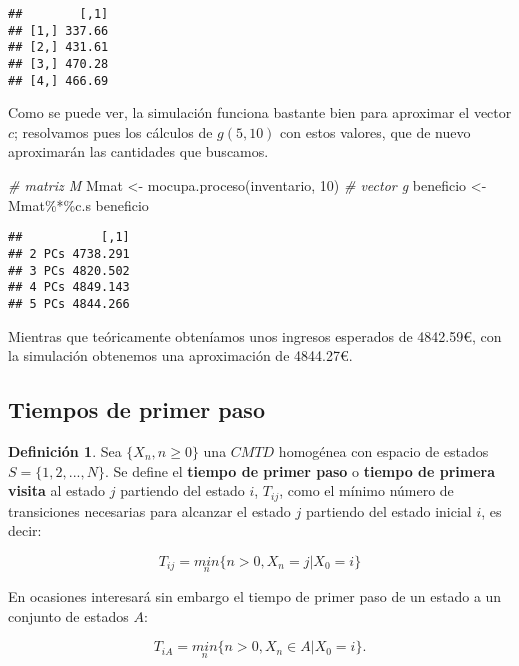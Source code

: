 \documentclass[
]{book}
\newenvironment{Shaded}{\begin{snugshade}}{\end{snugshade}}
\newcommand{\CommentTok}[1]{\textcolor[rgb]{0.56,0.35,0.01}{\textit{#1}}}
\newcommand{\DecValTok}[1]{\textcolor[rgb]{0.00,0.00,0.81}{#1}}
\newcommand{\FunctionTok}[1]{\textcolor[rgb]{0.00,0.00,0.00}{#1}}
\newcommand{\NormalTok}[1]{#1}
\newcommand{\OtherTok}[1]{\textcolor[rgb]{0.56,0.35,0.01}{#1}}
\newcommand{\SpecialCharTok}[1]{\textcolor[rgb]{0.00,0.00,0.00}{#1}}
\newenvironment{yellowbox}{
  \definecolor{shadecolor}{rgb}{210, 180, 140}  
  \color{black}
  \begin{shaded}}
 {\end{shaded}}
\theoremstyle{definition}
\newtheorem{definition}{Definición}[chapter]
\theoremstyle{definition}
\theoremstyle{definition}
\theoremstyle{definition}
\theoremstyle{remark}
\begin{document}
\begin{verbatim}
##        [,1]
## [1,] 337.66
## [2,] 431.61
## [3,] 470.28
## [4,] 466.69
\end{verbatim}

Como se puede ver, la simulación funciona bastante bien para aproximar el vector \(c\); resolvamos pues los cálculos de \(g(5,10)\) con estos valores, que de nuevo aproximarán las cantidades que buscamos.

\begin{Shaded}
\begin{Highlighting}[]
\CommentTok{\# matriz M}
\NormalTok{Mmat }\OtherTok{\textless{}{-}} \FunctionTok{mocupa.proceso}\NormalTok{(inventario, }\DecValTok{10}\NormalTok{)}
\CommentTok{\# vector g}
\NormalTok{beneficio }\OtherTok{\textless{}{-}}\NormalTok{ Mmat}\SpecialCharTok{\%*\%}\NormalTok{c.s}
\NormalTok{beneficio}
\end{Highlighting}
\end{Shaded}

\begin{verbatim}
##           [,1]
## 2 PCs 4738.291
## 3 PCs 4820.502
## 4 PCs 4849.143
## 5 PCs 4844.266
\end{verbatim}

Mientras que teóricamente obteníamos unos ingresos esperados de 4842.59€, con la simulación obtenemos una aproximación de 4844.27€.

\hypertarget{tiempos-de-primer-paso}{%
\subsection{Tiempos de primer paso}\label{tiempos-de-primer-paso}}

\begin{yellowbox}

\begin{definition}
Sea \(\{X_n, n \geq 0\}\) una \(CMTD\) homogénea con espacio de estados \(S = \{1, 2,...,N\}\). Se define el \textbf{tiempo de primer paso} o \textbf{tiempo de primera visita} al estado \(j\) partiendo del estado \(i\), \(T_{ij}\), como el mínimo número de transiciones necesarias para alcanzar el estado \(j\) partiendo del estado inicial \(i\), es decir:

\[T_{ij} = \underset{n}{min}\{n > 0, X_n = j | X_0 = i\}\]

En ocasiones interesará sin embargo el tiempo de primer paso de un estado a un conjunto de estados \(A\):

\[T_{iA} = \underset{n}{min}\{n > 0, X_n \in A | X_0 = i\}.\]
\end{definition}

\end{yellowbox}
\end{document}
